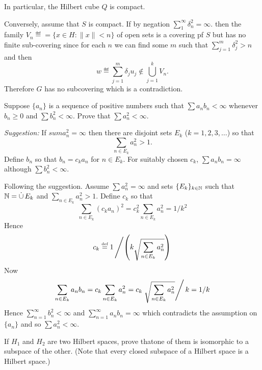 \begin{enumerate}
In particular, the Hilbert cube $Q$ is compact.

Conversely, assume that $S$ is compact.
If by negation \(\sum_1^\infty \delta_n^2 = \infty\).
then the family \(V_n \eqdef = \{x\in H: \|x\| < n\}\) of open sets
is a covering pf $S$ but has no finite sub-covering
since for each $n$ we can find some $m$ such that
\(\sum_{j=1}^m \delta_j^2 > n\) and then
\begin{equation*}
w \eqdef \sum_{j=1}^m \delta_j u_j \notin \bigcup_{j=1}^k V_n.
\end{equation*}
Therefore $G$ has no subcovering which is a contradiction.


\begin{excopy}
Suppose \(\{a_n\}\) is a sequence of positive numbers
such that \(\sum a_n b_n < \infty \)
whenever \(b_n \geq 0\)
and
  \(\sum b_n^2 < \infty\).
Prove that
  \(\sum a_n^2 < \infty\).

\emph{Suggestion:} If \(sum a_n^2 = \infty\) then there are disjoint
sets \(E_k\) (\(k=1,2,3,\ldots\)) so that
\begin{equation*}
 \sum_{n\in E_k} a_n^2 > 1.
\end{equation*}
Define \(b_n\) so that \(b_n = c_k a_n\) for \(n\in E_k\). For suitably chosen
\(c_k\), \(\sum a_n b_n = \infty\) although \(\sum b_n^2 < \infty\).
\end{excopy}

Following the suggestion. Assume  \(\sum a_n^2 = \infty\)
and sets \(\{E_k\}_{k\in\mathbb{N}}\) such that \(\N = \disjunion E_k\) and
\(\sum_{n\in E_k} a_n^2 > 1\).
Define \(c_k\) so that
\begin{equation*}
\sum_{n\in E_k} (c_k a_n)^2  = c_k^2 \sum_{n\in E_k} a_n^2  = 1/k^2
\end{equation*}
Hence
\begin{equation*}
c_k \stackrel{\mbox{\upshape\tiny def}}{=} 1 \left/ \left( k \sqrt{\sum_{n\in E_k} a_n^2} \right)\right.
\end{equation*}
Now
\begin{equation*}
\sum_{n\in E_k} a_n b_n = c_k \sum_{n\in E_k} a_n^2
=  c_k \left. \sqrt{\sum_{n\in E_k} a_n^2} \right/ k
= 1/k
\end{equation*}
Hence
\(\sum_{n=1}^\infty b_n^2 < \infty\)
and
\(\sum_{n=1}^\infty a_n b_n = \infty\)
which contradicts the assumption on \(\{a_n\}\)
and so \(\sum a_n^2 < \infty\).


\begin{excopy}
If \(H_1\) and \(H_2\) are two Hilbert spaces, prove thatone of them
is isomorphic to a subspace of the other. (Note that every closed subspace
of a Hilbert space is a Hilbert space.)
\end{excopy}


\end{enumerate}
